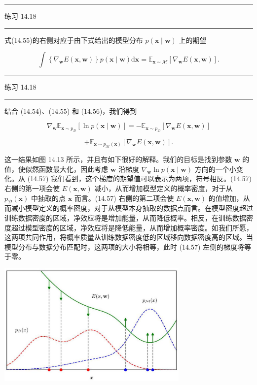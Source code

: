 \documentclass[10pt]{report}
\newcommand{\HRule}{\begin{center}\rule{0.9\linewidth}{0.2mm}\end{center}}
\begin{document}
\HRule

练习 14.18

\HRule

式(14.55)的右侧对应于由下式给出的模型分布 \(p\left( {\mathbf{x} \mid  \mathbf{w}}\right)\) 上的期望

\[
\int \left\{  {{\nabla }_{\mathbf{w}}E\left( {\mathbf{x},\mathbf{w}}\right) }\right\}  p\left( {\mathbf{x} \mid  \mathbf{w}}\right) \mathrm{d}\mathbf{x} = {\mathbb{E}}_{\mathbf{x} \sim  \mathcal{M}}\left\lbrack  {{\nabla }_{\mathbf{w}}E\left( {\mathbf{x},\mathbf{w}}\right) }\right\rbrack  . \tag{14.56}
\]

\HRule

练习 14.18

\HRule

结合 (14.54)、(14.55) 和 (14.56)，我们得到

\[
{\nabla }_{\mathbf{w}}{\mathbb{E}}_{\mathbf{x} \sim  {p}_{\mathcal{D}}}\left\lbrack  {\ln p\left( {\mathbf{x} \mid  \mathbf{w}}\right) }\right\rbrack   =  - {\mathbb{E}}_{\mathbf{x} \sim  {p}_{\mathcal{D}}}\left\lbrack  {{\nabla }_{\mathbf{w}}E\left( {\mathbf{x},\mathbf{w}}\right) }\right\rbrack
\]

\[
+ {\mathbb{E}}_{\mathbf{x} \sim  {p}_{\mathcal{M}}\left( \mathbf{x}\right) }\left\lbrack  {{\nabla }_{\mathbf{w}}E\left( {\mathbf{x},\mathbf{w}}\right) }\right\rbrack  . \tag{14.57}
\]

这一结果如图 14.13 所示，并且有如下很好的解释。我们的目标是找到参数 \(\mathbf{w}\) 的值，使似然函数最大化，因此考虑 \(\mathbf{w}\) 沿梯度 \({\nabla }_{\mathbf{w}}\ln p\left( {\mathbf{x} \mid  \mathbf{w}}\right)\) 方向的一个小变化。从 (14.57) 我们看到，这个梯度的期望值可以表示为两项，符号相反。(14.57) 右侧的第一项会使 \(E\left( {\mathbf{x},\mathbf{w}}\right)\) 减小，从而增加模型定义的概率密度，对于从 \({p}_{\mathcal{D}}\left( \mathbf{x}\right)\) 中抽取的点 \(\mathbf{x}\) 而言。(14.57) 右侧的第二项会使 \(E\left( {\mathbf{x},\mathbf{w}}\right)\) 的值增加，从而减小模型定义的概率密度，对于从模型本身抽取的数据点而言。在模型密度超过训练数据密度的区域，净效应将是增加能量，从而降低概率。相反，在训练数据密度超过模型密度的区域，净效应将是降低能量，从而增加概率密度。如我们所愿，这两项共同作用，将概率质量从训练数据密度低的区域移向数据密度高的区域。当模型分布与数据分布匹配时，这两项的大小将相等，此时 (14.57) 左侧的梯度将等于零。

\begin{center}
\includegraphics[max width=0.7\textwidth]{images/0194e279-9b28-703a-88f4-c3ac21e2010d_473_571_346_930_603_0.jpg}
\end{center}
\hspace*{3em} 
\end{document}
